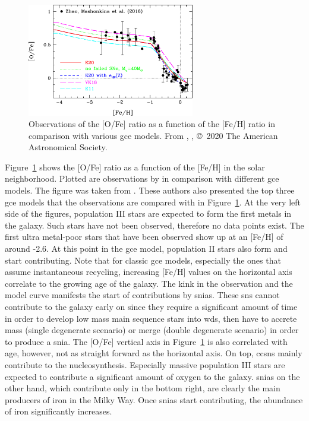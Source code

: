 \begin{figure}[tb]
    \centering
    \includegraphics[width=0.65\textwidth]{graphics/gce/kobayashi20_fig3}
    \caption{Observations of the [O/Fe] ratio as a function of the [Fe/H] ratio in comparison with various \ac{gce} models. From \citet{kobayashi20}, , \copyright\ 2020 The American Astronomical Society.}
    \label{fig:gce:kob20_o_fe_versu_fe_h}
\end{figure}
Figure~\ref{fig:gce:kob20_o_fe_versu_fe_h} shows the [O/Fe] ratio as a function of the [Fe/H] in the solar neighborhood. Plotted are observations by \citet{zhao16} in comparison with different \ac{gce} models. The figure was taken from \citet{kobayashi20}. These authors also presented the top three \ac{gce} models that the observations are compared with in Figure~\ref{fig:gce:kob20_o_fe_versu_fe_h}. At the very left side of the figures, population III stars are expected to form the first metals in the galaxy. Such stars have not been observed, therefore no data points exist. The first ultra metal-poor stars that have been observed show up at an [Fe/H] of around -2.6. At this point in the \ac{gce} model, population II stars also form and start contributing. Note that for classic \ac{gce} models, especially the ones that assume instantaneous recycling, increasing [Fe/H] values on the horizontal axis correlate to the growing age of the galaxy. The kink in the observation and the model curve manifests the start of contributions by \acp{snia}. These \acp{sn} cannot contribute to the galaxy early on since they require a significant amount of time in order to develop low mass main sequence stars into \acp{wd}, then have to accrete mass (single degenerate scenario) or merge (double degenerate scenario) in order to produce a \ac{snia}. The [O/Fe] vertical axis in Figure~\ref{fig:gce:kob20_o_fe_versu_fe_h} is also correlated with age, however, not as straight forward as the horizontal axis. On top, \acp{ccsn} mainly contribute to the nucleosynthesis. Especially massive population III stars are expected to contribute a significant amount of oxygen to the galaxy. \acp{snia} on the other hand, which contribute only in the bottom right, are clearly the main producers of iron in the Milky Way. Once \acp{snia} start contributing, the abundance of iron significantly increases.

